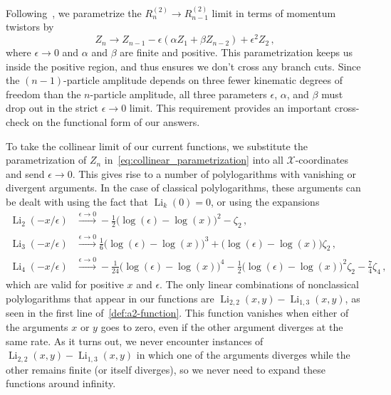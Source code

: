 \documentclass[11pt]{article}
\DeclareMathOperator{\Li}{Li}
\def\x{\mathcal{X}}
\begin{document}
Following~\cite{CaronHuot:2011ky}, we parametrize the $R_n^{(2)} \to R_{n-1}^{(2)}$ limit in terms of momentum twistors by
\begin{equation} \label{eq:collinear_parametrization}
Z_n \to Z_{n-1} - \epsilon (\alpha Z_1 + \beta Z_{n-2}) + \epsilon^2 Z_2 \, ,
\end{equation}
where $\epsilon \to 0$ and $\alpha$ and $\beta$ are finite and positive. This parametrization keeps us inside the positive region, and thus ensures we don't cross any branch cuts. Since the $(n{-}1)$-particle amplitude depends on three fewer kinematic degrees of freedom than the $n$-particle amplitude, all three parameters $\epsilon$, $\alpha$, and $\beta$ must drop out in the strict $\epsilon \to 0$ limit. This requirement provides an important cross-check on the functional form of our answers.

To take the collinear limit of our current functions, we substitute the parametrization of $Z_n$ in~\eqref{eq:collinear_parametrization} into all $\x$-coordinates and send $\epsilon \to 0$. This gives rise to a number of polylogarithms with vanishing or divergent arguments. In the case of classical polylogarithms, these arguments can be dealt with using the fact that $\Li_k(0) = 0$, or using the expansions
\begin{align}
\Li_2(-x/\epsilon) &\xrightarrow[]{\epsilon \to 0} - \frac{1}{2} \big(\log(\epsilon) - \log (x) \big)^2  - \zeta_2 \, ,\\
\Li_3(-x/\epsilon) &\xrightarrow[]{\epsilon \to 0}  \frac{1}{6} \big(\log(\epsilon) - \log (x) \big)^3 + 
\big(\log(\epsilon) - \log (x) \big) \zeta_2   \, ,\\
\Li_4(-x/\epsilon) &\xrightarrow[]{\epsilon \to 0}  -\frac{1}{24} \big(\log(\epsilon) - \log (x) \big)^4 - 
  \frac{1}{2} \big(\log(\epsilon) - \log (x) \big)^2 \zeta_2 - \frac{7}{4} \zeta_4  \, ,
\end{align} 
which are valid for positive $x$ and $\epsilon$. The only linear combinations of nonclassical polylogarithms that appear in our functions are $\Li_{2, 2}(x, y) - \Li_{1, 3}(x, y)$, as seen in the first line of~\eqref{def:a2-function}. This function vanishes when either of the arguments $x$ or $y$ goes to zero, even if the other argument diverges at the same rate. As it turns out, we never encounter instances of $\Li_{2, 2}(x, y) - \Li_{1, 3}(x, y)$ in which one of the arguments diverges while the other remains finite (or itself diverges), so we never need to expand these functions around infinity. 
\end{document}
